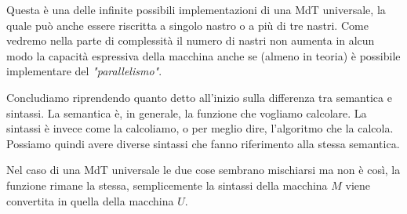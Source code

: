 Questa è una delle infinite possibili implementazioni di una
MdT universale, la quale può anche essere riscritta a singolo
nastro o a più di tre nastri. Come vedremo nella parte di
complessità il numero di nastri non aumenta in alcun modo la
capacità espressiva della macchina anche se (almeno in teoria)
è possibile implementare del \emph{"parallelismo"}.

Concludiamo riprendendo quanto detto all'inizio sulla differenza
tra semantica e sintassi. La semantica è, in generale, la
funzione che vogliamo calcolare. La sintassi è invece come la
calcoliamo, o per meglio dire, l'algoritmo che la calcola.
Possiamo quindi avere diverse sintassi che fanno riferimento
alla stessa semantica.

Nel caso di una MdT universale le due cose sembrano mischiarsi
ma non è così, la funzione rimane la stessa, semplicemente la
sintassi della macchina $M$ viene convertita in quella della
macchina $U$.